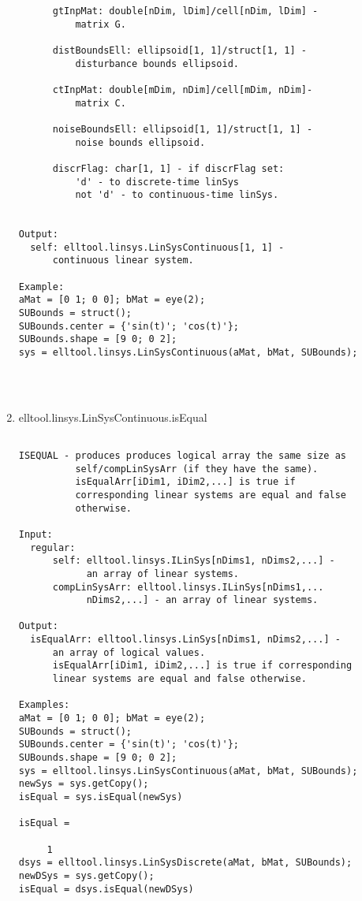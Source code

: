 \begin{enumerate}
\begin{lstlisting}
      gtInpMat: double[nDim, lDim]/cell[nDim, lDim] -
          matrix G.

      distBoundsEll: ellipsoid[1, 1]/struct[1, 1] -
          disturbance bounds ellipsoid.

      ctInpMat: double[mDim, nDim]/cell[mDim, nDim]-
          matrix C.

      noiseBoundsEll: ellipsoid[1, 1]/struct[1, 1] -
          noise bounds ellipsoid.

      discrFlag: char[1, 1] - if discrFlag set:
          'd' - to discrete-time linSys
          not 'd' - to continuous-time linSys.


Output:
  self: elltool.linsys.LinSysContinuous[1, 1] -
      continuous linear system.

Example:
aMat = [0 1; 0 0]; bMat = eye(2);
SUBounds = struct();
SUBounds.center = {'sin(t)'; 'cos(t)'};
SUBounds.shape = [9 0; 0 2];
sys = elltool.linsys.LinSysContinuous(aMat, bMat, SUBounds);




\end{lstlisting}
\fontfamily{\familydefault}
\selectfont
\item {elltool.linsys.LinSysContinuous.isEqual}
\selectfont
\begin{lstlisting}

ISEQUAL - produces produces logical array the same size as
          self/compLinSysArr (if they have the same).
          isEqualArr[iDim1, iDim2,...] is true if
          corresponding linear systems are equal and false
          otherwise.

Input:
  regular:
      self: elltool.linsys.ILinSys[nDims1, nDims2,...] -
            an array of linear systems.
      compLinSysArr: elltool.linsys.ILinSys[nDims1,...
            nDims2,...] - an array of linear systems.

Output:
  isEqualArr: elltool.linsys.LinSys[nDims1, nDims2,...] -
      an array of logical values.
      isEqualArr[iDim1, iDim2,...] is true if corresponding
      linear systems are equal and false otherwise.

Examples:
aMat = [0 1; 0 0]; bMat = eye(2);
SUBounds = struct();
SUBounds.center = {'sin(t)'; 'cos(t)'};
SUBounds.shape = [9 0; 0 2];
sys = elltool.linsys.LinSysContinuous(aMat, bMat, SUBounds);
newSys = sys.getCopy();
isEqual = sys.isEqual(newSys)

isEqual =

     1
dsys = elltool.linsys.LinSysDiscrete(aMat, bMat, SUBounds);
newDSys = sys.getCopy();
isEqual = dsys.isEqual(newDSys)


\end{lstlisting}
\end{enumerate}
